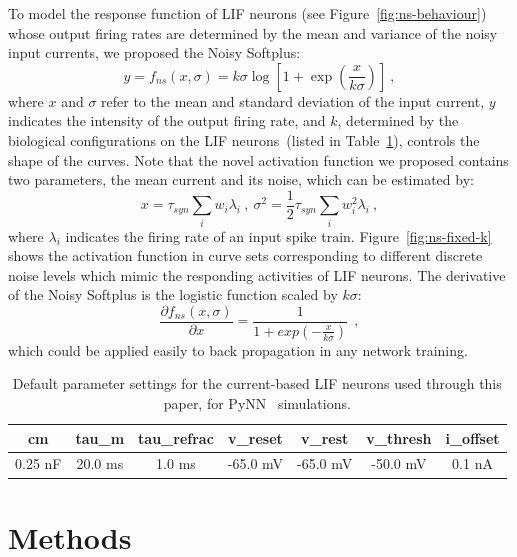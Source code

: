 \documentclass{article}
\begin{document}
To model the response function of LIF neurons (see Figure~\ref{fig:ns-behaviour}) whose output firing rates are determined by the mean and variance of the noisy input currents, we proposed the Noisy Softplus:
\begin{equation}
y = f_{ns}(x, \sigma) = k \sigma \log [1 + \exp(\frac{x}{k \sigma})]~,
\label{equ:nsp}
\end{equation}
where $x$ and $\sigma$ refer to the mean and standard deviation of the input current, $y$ indicates the intensity of the output firing rate, and $k$, determined by the biological configurations on the LIF neurons~(listed in Table~\ref{tbl:pynnConfig}), controls the shape of the curves.
Note that the novel activation function we proposed contains two parameters, the mean current and its noise, which can be estimated by:
\begin{equation}
x = \tau_{syn}\sum_i w_i\lambda_{i}~, ~\sigma^2=\frac{1}{2}\tau_{syn}\sum_i w_i^2\lambda_{i}~,
\label{equ:distr}
\end{equation}
where $\lambda_i$ indicates the firing rate of an input spike train.
Figure~\ref{fig:ns-fixed-k} shows the activation function in curve sets corresponding to different discrete noise levels which mimic the responding activities of LIF neurons.
The derivative of the Noisy Softplus is the logistic function scaled by $k\sigma$:
\begin{equation}
\frac{\partial f_{ns}(x,\sigma)}{\partial x} = \frac{1}{1+exp(-\frac{x}{k\sigma})}~~,
\label{equ:logist}
\end{equation}	
which could be applied easily to back propagation in any network training.

\begin{table}[thb]
	\centering
	\caption{\label{tbl:pynnConfig}Default parameter settings for the current-based LIF neurons used through this paper, for PyNN~\cite{davison2008pynn} simulations.}
	\bgroup
	\def\arraystretch{1.4}
	\begin{tabular}{c c c c c c c}
		cm & tau\_m & tau\_refrac & v\_reset & v\_rest& v\_thresh & i\_offset \\
		\hline
		0.25 nF & 20.0 ms & 1.0 ms & -65.0 mV & -65.0 mV & -50.0 mV &  0.1 nA 
	\end{tabular}
	\egroup
\end{table}


\section{Methods}	
\label{sec:meth}
\end{document}
